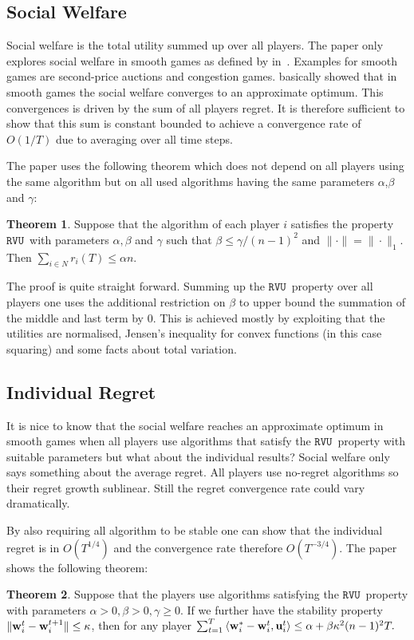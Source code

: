 \documentclass[a4paper]{article}
\theoremstyle{definition}
\newtheorem{theorem}{Theorem}
\newcommand{\myprop}{\ensuremath{\texttt{RVU}}}
\newcommand{\mst}{\ensuremath{w}}
\newcommand{\stable}{\ensuremath{\kappa}}
\renewcommand{\vec}[1]{\ensuremath{{\bf #1}}}
\newcommand{\dotp}[2]{\ensuremath{\left\langle #1, #2 \right\rangle}}
\begin{document}
\subsection{Social Welfare}
Social welfare is the total utility summed up over all players.
The paper only explores social welfare in smooth games as defined by
\citeauthor{Roughgarden:2009:IRP:1536414.1536485} in~\cite{Roughgarden:2009:IRP:1536414.1536485}.
Examples for smooth games are second-price auctions and congestion
games.
\citeauthor{Roughgarden:2009:IRP:1536414.1536485} basically showed
that in smooth games the social welfare converges to an approximate
optimum.
This convergences is driven by the sum of all players regret.
It is therefore sufficient to show that this sum is constant bounded
to achieve a convergence rate of $O(1/T)$ due to averaging over all
time steps.

The paper uses the following theorem which does not depend on all
players using the same algorithm but on all used algorithms having the
same parameters $\alpha$,$\beta$ and $\gamma$:

\begin{theorem}\label{thm:sufficient}
Suppose that the algorithm of each player $i$ satisfies the property
\myprop~with parameters $\alpha, \beta$ and $\gamma$ such that
$\beta\leq \gamma/(n-1)^2$ and $\|\cdot\| = \|\cdot\|_1$. Then
$\sum_{i\in N} r_i(T) \leq \alpha n$.
\end{theorem}


The proof is quite straight forward.
Summing up the \myprop~property over all players one uses the
additional restriction on $\beta$ to upper bound the summation of the
middle and last term by 0. This is achieved mostly by exploiting that
the utilities are normalised, Jensen's
inequality for convex functions (in this case squaring) and some facts
about total variation.


\subsection{Individual Regret}
It is nice to know that the social welfare reaches an approximate
optimum in smooth games when all players use algorithms that satisfy
the \myprop~property with suitable parameters but what about the
individual results?
Social welfare only says something about the average regret.
All players use no-regret algorithms so their regret growth sublinear.
Still the regret convergence rate could vary dramatically.

By also requiring all algorithm to be stable one can show that the
individual regret is in $O(T^{1/4})$ and the convergence rate
therefore $O(T^{-3/4})$.
The paper shows the following theorem:
\setcounter{theorem}{10}
\begin{theorem}\label{thm:sufficient-2}
Suppose that the players use algorithms satisfying the
\myprop~property with parameters $\alpha > 0, \beta > 0,\gamma \geq
0$. If we further have the stability property $\|\vec{\mst}_i^t -
\vec{\mst}_i^{t+1}\|\leq \stable$, then for any player
$\sum_{t=1}^{T} \dotp{\vec{\mst}_i^*-\vec{\mst}_i^t}{ \vec{u}_i^t}\leq
\alpha + \beta \stable^2 (n-1)^2 T.$
\end{theorem}
\end{document}
